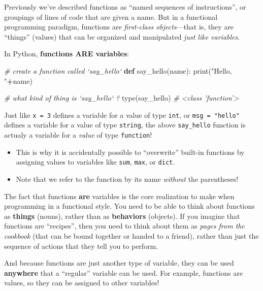\documentclass[]{book}
\newenvironment{Shaded}{\begin{snugshade}}{\end{snugshade}}
\newcommand{\KeywordTok}[1]{\textcolor[rgb]{0.13,0.29,0.53}{\textbf{#1}}}
\newcommand{\StringTok}[1]{\textcolor[rgb]{0.31,0.60,0.02}{#1}}
\newcommand{\CommentTok}[1]{\textcolor[rgb]{0.56,0.35,0.01}{\textit{#1}}}
\newcommand{\OperatorTok}[1]{\textcolor[rgb]{0.81,0.36,0.00}{\textbf{#1}}}
\newcommand{\BuiltInTok}[1]{#1}
\newcommand{\NormalTok}[1]{#1}
\providecommand{\tightlist}{%
  \setlength{\itemsep}{0pt}\setlength{\parskip}{0pt}}
\begin{document}
Previously we've described functions as ``named sequences of
instructions'', or groupings of lines of code that are given a name. But
in a functional programming paradigm, functions are \emph{first-class
objects}---that is, they are ``things'' (values) that can be organized
and manipulated \emph{just like variables}.

In Python, \textbf{functions ARE variables}:

\begin{Shaded}
\begin{Highlighting}[]
\CommentTok{# create a function called `say_hello`}
\KeywordTok{def}\NormalTok{ say_hello(name):}
    \BuiltInTok{print}\NormalTok{(}\StringTok{"Hello, "}\OperatorTok{+}\NormalTok{name)}

\CommentTok{# what kind of thing is `say_hello` ?}
\BuiltInTok{type}\NormalTok{(say_hello)  }\CommentTok{# <class 'function'>}
\end{Highlighting}
\end{Shaded}

Just like \texttt{x\ =\ 3} defines a variable for a value of type
\texttt{int}, or \texttt{msg\ =\ "hello"} defines a variable for a value
of type \texttt{string}, the above \texttt{say\_hello} function is
actualy a variable for a \emph{value} of type \texttt{function}!

\begin{itemize}
\tightlist
\item
  This is why it is accidentally possible to ``overwrite'' built-in
  functions by assigning values to variables like \texttt{sum},
  \texttt{max}, or \texttt{dict}.
\item
  Note that we refer to the function by its name \emph{without} the
  parentheses!
\end{itemize}

The fact that functions \textbf{are} variables is the core realization
to make when programming in a functional style. You need to be able to
think about functions as \textbf{things} (nouns), rather than as
\textbf{behaviors} (objects). If you imagine that functions are
``recipes'', then you need to think about them as \emph{pages from the
cookbook} (that can be bound together or handed to a friend), rather
than just the sequence of actions that they tell you to perform.

And because functions are just another type of variable, they can be
used \textbf{anywhere} that a ``regular'' variable can be used. For
example, functions are values, so they can be assigned to other
variables!
\end{document}
